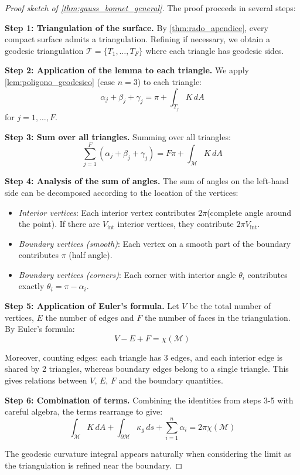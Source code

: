 \begin{proof}[Proof sketch of \autoref{thm:gauss_bonnet_general}]
The proof proceeds in several steps:

\textbf{Step 1: Triangulation of the surface.}
By \autoref{thm:rado_apendice}, every compact surface admits a triangulation. Refining if necessary, we obtain a geodesic triangulation $\mathcal{T} = \{T_1, \ldots, T_F\}$ where each triangle has geodesic sides.

\textbf{Step 2: Application of the lemma to each triangle.}
We apply \autoref{lem:poligono_geodesico} (case $n=3$) to each triangle:
\[
\alpha_j + \beta_j + \gamma_j = \pi + \int_{T_j} K \, dA
\]
for $j = 1, \ldots, F$.

\textbf{Step 3: Sum over all triangles.}
Summing over all triangles:
\[
\sum_{j=1}^F (\alpha_j + \beta_j + \gamma_j) = F\pi + \int_{\mathcal{M}} K \, dA
\]

\textbf{Step 4: Analysis of the sum of angles.}
The sum of angles on the left-hand side can be decomposed according to the location of the vertices:
\begin{itemize}
    \item \textit{Interior vertices}: Each interior vertex contributes $2\pi$(complete angle around the point). If there are $V_{\text{int}}$ interior vertices, they contribute $2\pi V_{\text{int}}$.
    \item \textit{Boundary vertices (smooth)}: Each vertex on a smooth part of the boundary contributes $\pi$ (half angle).
    \item \textit{Boundary vertices (corners)}: Each corner with interior angle $\theta_i$ contributes exactly $\theta_i = \pi - \alpha_i$.
\end{itemize}

\textbf{Step 5: Application of Euler's formula.} Let $V$ be the total number of vertices, $E$ the number of edges and $F$ the number  of faces in the triangulation. By Euler's formula:
\[
V - E + F = \chi(\mathcal{M})
\]

Moreover, counting edges: each triangle has 3 edges, and each interior edge is shared by 2 triangles, whereas boundary edges belong to a single triangle. This gives relations between $V$, $E$, $F$ and the boundary quantities.

\textbf{Step 6: Combination of terms.}
Combining the identities from steps 3-5 with careful algebra, the terms rearrange to give:
\[
\int_{\mathcal{M}} K \, dA + \int_{\partial \mathcal{M}} \kappa_g \, ds + \sum_{i=1}^n \alpha_i = 2\pi \chi(\mathcal{M})
\]

The geodesic curvature integral appears naturally when considering the limit as the triangulation is refined near the boundary.
\end{proof}

